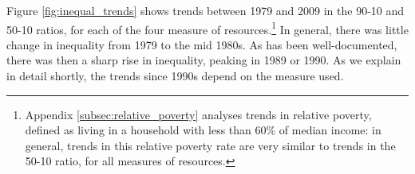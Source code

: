 

Figure \ref{fig:inequal_trends} shows trends between 1979 and 2009 in the 90-10 and 50-10 ratios, for each of the four measure of resources.\footnote{Appendix \ref{subsec:relative_poverty} analyses trends in relative poverty, defined as living in a household with less than 60\% of median income: in general, trends in this relative poverty rate are very similar to trends in the 50-10 ratio, for all measures of resources.} In general, there was little change in inequality from 1979 to the mid 1980s. As has been well-documented, there was then a sharp rise in inequality, peaking in 1989 or 1990. As we explain in detail shortly, the trends since 1990s depend on the measure used.

